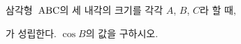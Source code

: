 삼각형~$\mathrm{ABC}$의 세 내각의 크기를 각각 $A$, $B$, $C$라 할 때, \par\smallskip{}\par\smallskip\noindent 가 성립한다. $\cos B$의 값을 구하시오.
